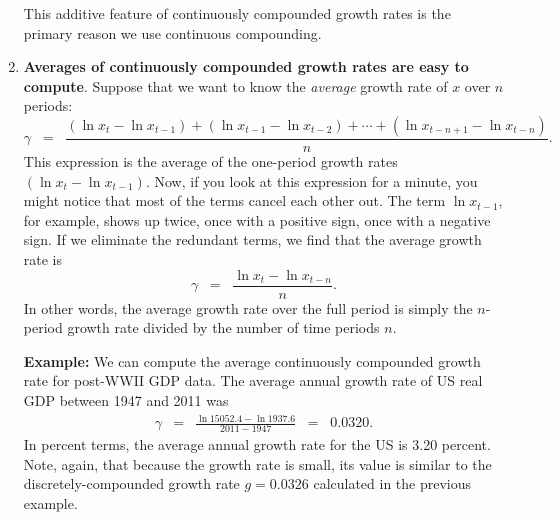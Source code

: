 \begin{enumerate}
This additive feature of continuously compounded growth rates is the primary reason we use continuous compounding.

\item \textbf{Averages of continuously compounded growth rates are easy to compute}.  Suppose that we want to know the \emph{average} growth rate of $x$ over $n$ periods:
\[
    \gamma \;\;=\;\; \frac{ (\ln x_{t}-\ln x_{t-1}) + (\ln x_{t-1}-\ln x_{t-2})
                    + \cdots + (\ln x_{t-n+1} - \ln x_{t-n}) }
                {n} .
\]
This expression is the average of the one-period growth rates $(\ln x_{t}-\ln x_{t-1})$. Now, if you look at this expression for a minute, you might notice that most of the terms cancel each other out.
The term $\ln x_{t-1}$, for example, shows up twice, once with a positive sign, once with a negative sign. If we eliminate the redundant terms, we find that the average growth rate is
\[
    \gamma \;\;=\;\; \frac{ \ln x_{t}-\ln x_{t-n} }  {n}  .
\]
In other words, the average growth rate over the full period is simply the
$n$-period growth rate divided by the number of time periods $n$.

\textbf{Example:} We can compute the average continuously compounded growth rate for post-WWII GDP data. The average annual growth rate of US real GDP between 1947 and 2011 was
\begin{eqnarray*}
    \gamma &=& \frac{\ln 15052.4 - \ln 1937.6 }{2011-1947} \;\;=\;\; 0.0320.
\end{eqnarray*}
In percent terms, the average annual growth rate for the US is 3.20 percent.
Note, again, that because the growth rate is small,
its value is similar to the discretely-compounded growth rate $g = 0.0326$
calculated in the previous example.


%
\end{enumerate}




